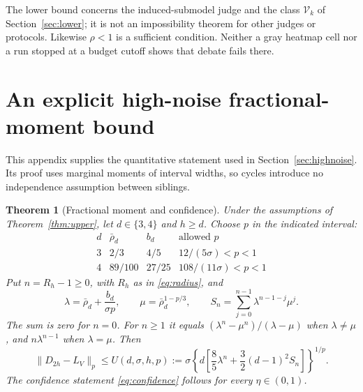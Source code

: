 \documentclass[11pt]{article}
\newtheorem{theorem}{Theorem}[section]
\theoremstyle{definition}
\theoremstyle{remark}
\newcommand{\Vcl}{\mathcal V}
\begin{document}
The lower bound concerns the induced-submodel judge and the class $\Vcl_k$
of Section~\ref{sec:lower}; it is not an impossibility theorem for other
judges or protocols. Likewise $\rho<1$ is a sufficient condition. Neither a
gray heatmap cell nor a run stopped at a budget cutoff shows that debate
fails there.

\appendix
\clearpage
\section{An explicit high-noise fractional-moment bound}
\label{app:fractional}

This appendix supplies the quantitative statement used in
Section~\ref{sec:highnoise}. Its proof uses marginal moments of interval
widths, so cycles introduce no independence assumption between siblings.

\begin{theorem}[Fractional moment and confidence]
\label{thm:fractional}
Under the assumptions of Theorem~\ref{thm:upper}, let $d\in\{3,4\}$ and
$h\ge d$. Choose $p$ in the indicated interval:
\[
\begin{array}{c|ccc}
 d&\bar\rho_d&b_d&\text{allowed }p\\\hline
 3&2/3&4/5&12/(5\sigma)<p<1\\
 4&89/100&27/25&108/(11\sigma)<p<1
\end{array}
\]
Put $n=R_h-1\ge0$, with $R_h$ as in \eqref{eq:radius}, and
\[
 \lambda=\bar\rho_d+\frac{b_d}{\sigma p},\qquad
 \mu=\bar\rho_d^{1-p/3},\qquad
 S_n=\sum_{j=0}^{n-1}\lambda^{n-1-j}\mu^j.
\]
The sum is zero for $n=0$. For $n\ge1$ it equals
$(\lambda^n-\mu^n)/(\lambda-\mu)$ when $\lambda\ne\mu$, and
$n\lambda^{n-1}$ when $\lambda=\mu$. Then
\begin{equation}
 \|D_{2h}-L_V\|_p\le U(d,\sigma,h,p)
 :=\sigma\left\{d\left[\frac85\lambda^n+
                  \frac32(d-1)^2 S_n\right]\right\}^{1/p}.
 \label{eq:fractional}
\end{equation}
The confidence statement \eqref{eq:confidence} follows for every
$\eta\in(0,1)$.
\end{theorem}
\end{document}
